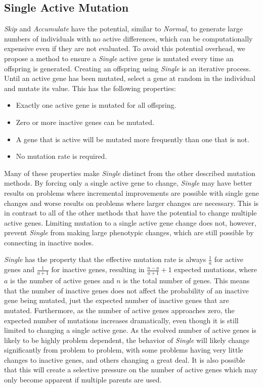 \documentclass[runningheads,a4paper]{llncs}
\begin{document}
\subsection{Single Active Mutation}
\emph{Skip}
and \emph{Accumulate} have the potential, similar to \emph{Normal}, to generate large numbers of individuals
with no active differences, which can be computationally expensive even if they
are not evaluated. To avoid
this potential overhead, we propose a method to ensure a \emph{Single} active
gene is mutated every time an offspring is generated.
%
Creating an offspring using \emph{Single} is an iterative process.  Until an
active gene has been mutated, select a gene at random in the individual and
mutate its value.  This has the following properties:
\begin{itemize}
\item Exactly one active gene is mutated for all offspring.
\item Zero or more inactive genes can be mutated.
\item A gene that is active will be mutated more frequently than one that is not.
\item No mutation rate is required.
\end{itemize}
Many of these properties make \emph{Single} distinct from the other described mutation
methods.  By forcing only a single active gene to change, \emph{Single} may have
better results on problems where incremental improvements are possible with single
gene changes and worse results on problems where larger changes are necessary.
This is in contrast to all of the other methods that have the potential to change
multiple active genes.
Limiting mutation to a single active gene change does not, however, prevent \emph{Single}
from making large phenotypic changes, which are still possible by connecting
in inactive nodes.

\emph{Single} has the property that the effective mutation rate is always
$\frac{1}{a}$ for active genes and $\frac{1}{a + 1}$ for
inactive genes, resulting in $\frac{n - a}{a + 1} + 1$ expected mutations, where
$a$ is the number of active genes and $n$ is the total number of genes.  This
means that the number of inactive genes does not affect the probability of an
inactive gene being mutated, just the expected number of inactive genes that are
mutated.  Furthermore, as the number of active genes approaches zero, the expected
number of mutations increases dramatically, even though it is still limited to
changing a single active gene.  As the evolved number of active genes is likely to be
highly problem dependent, the behavior of \emph{Single} will likely change significantly
from problem to problem, with some problems having very little changes to inactive
genes, and others changing a great deal.  It is also possible that this will create
a selective pressure on the number of active genes which may only become apparent
if multiple parents are used.
\end{document}
